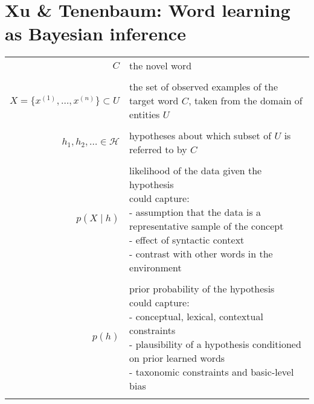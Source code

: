 \documentclass{tufte-book}
\begin{document}
\newpage

\section{Xu \& Tenenbaum: Word learning as Bayesian inference}




\setlength{\tabcolsep}{12pt}

\begin{tabular}{rl}
    $C$
    & the novel word
    \\\\
    $X = \{x^{(1)}, \hdots, x^{(n)}\} \subset U$
    & \specialcell{the set of observed examples of the target\\ word $C$, taken from the domain of entities $U$}
    \\\\
    $h_1, h_2, \hdots \in \mathcal{H}$
    & hypotheses about which subset of $U$ is referred to by $C$
    \\\\
    $p(X \mid h)$
    &  \specialcell{likelihood of the data given the hypothesis \\
                    \quad 
                    could capture: \\
                    \qquad
                    - assumption that the data is a representative sample of the concept\\
                    \qquad
                    - effect of syntactic context\\
                    \qquad
                    - contrast with other words in the environment\\
                }
    \\\\
    $p(h)$
    &  \specialcell{prior probability of the hypothesis \\
                    \quad 
                    could capture: \\
                    \qquad
                    - conceptual, lexical, contextual constraints\\
                    \qquad
                    - plausibility of a hypothesis conditioned on prior learned words\\
                    \qquad
                    - taxonomic constraints and basic-level bias\\
                }
    \\\\

\end{tabular}
\end{document}

